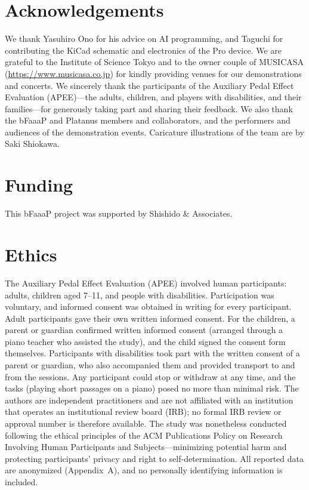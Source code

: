 \documentclass[11pt]{article}
\begin{document}


\section*{Acknowledgements}
We thank Yasuhiro Ono for his advice on AI programming, and Taguchi for
contributing the KiCad schematic and electronics of the Pro device. We are grateful to the
Institute of Science Tokyo and to the owner couple of MUSICASA
(\url{https://www.musicasa.co.jp}) for kindly providing venues for our
demonstrations and concerts. We sincerely thank the participants of the Auxiliary
Pedal Effect Evaluation (APEE)---the adults, children, and players with
disabilities, and their families---for generously taking part and sharing their
feedback. We also thank the bFaaaP and Platanus members and
collaborators, and the performers and audiences of the demonstration events.
Caricature illustrations of the team are by Saki Shiokawa.

\section*{Funding}
This bFaaaP project was supported by Shishido \& Associates.

\section*{Ethics}
The Auxiliary Pedal Effect Evaluation (APEE) involved human participants: adults,
children aged 7--11, and people with disabilities. Participation was voluntary, and
informed consent was obtained in writing for every participant. Adult participants gave
their own written informed consent. For the children, a parent or guardian confirmed
written informed consent (arranged through a piano teacher who assisted the study), and
the child signed the consent form themselves. Participants with disabilities took part
with the written consent of a parent or guardian, who also accompanied them and provided
transport to and from the sessions. Any participant could stop or withdraw at any time,
and the tasks (playing short passages on a piano) posed no more than minimal risk. The
authors are independent practitioners and are not affiliated with an institution that
operates an institutional review board (IRB); no formal IRB review or approval number is
therefore available. The study was nonetheless conducted following the ethical principles
of the ACM Publications Policy on Research Involving Human Participants and
Subjects---minimizing potential harm and protecting participants' privacy and right to
self-determination. All reported data are anonymized (Appendix~A), and no personally
identifying information is included.
\end{document}
